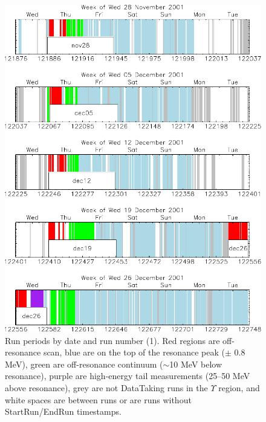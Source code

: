\documentclass[aps,prd,preprint,superscriptaddress,tightenlines,nofootinbib,floatfix]{revtex4}
\begin{document}
\begin{figure}[p]
  \includegraphics[width=0.95\linewidth]{scan_periods1}
  \caption{\label{scanperiods1} Run periods by date and run number
  (1).  Red regions are off-resonance scan, blue are on the top of the
  resonance peak ($\pm$ 0.8 MeV), green are off-resonance continuum
  ($\sim$10 MeV below resonance), purple are high-energy tail
  measurements (25--50 MeV above resonance), grey are not DataTaking
  runs in the $\Upsilon$ region, and white spaces are between runs or
  are runs without StartRun/EndRun timestamps.}
\end{figure}
\end{document}

